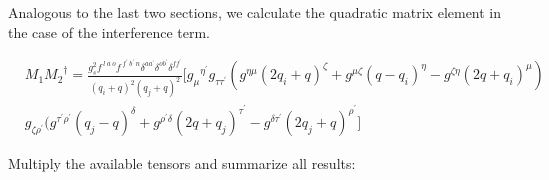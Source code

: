 Analogous to the last two sections, we calculate the quadratic matrix element in the case of the interference term.



\begin{equation}
\begin{split}
&M_1{M_2}^{\dagger}=\frac{g_s^2 f^{\:l\:a\:o} f^{\:f^{\prime}\: b^{\prime}\:n} \delta^{aa^{\prime}} \delta^{ob^{\prime}} \delta^{ff^{\prime}}}{(q_i +q)^2 (q_j +q)^2}
[{g_{{\mu}}}^{{\eta}^{\prime}} g_{{\tau}{{\tau}^{\prime}}}(g^{{\eta}{\mu}}(2q_i+q)^{\zeta}+g^{{\mu}{\zeta}}(q -q_i)^{\eta}-g^{{\zeta}{\eta}}(2q +q_i)^{\mu})\\
&g_{{{\zeta}}{{\rho}^{\prime}}}(g^{{{\tau}^{\prime}}{{\rho}^{\prime}}}(q_j-q)^{{\delta}}+g^{{{\rho}^{\prime}}{{\delta}}}(2q +q_j)^{{\tau}^{\prime}}-g^{{{\delta}}{{\tau}^{\prime}}}(2q_j+q)^{{\rho}^{\prime}}]
\end{split}
\end{equation}

Multiply the available tensors and summarize all results:


